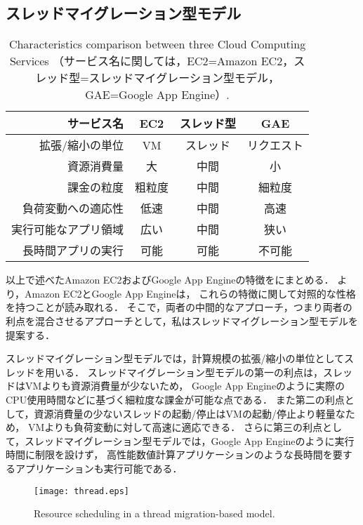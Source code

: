 \documentclass[10pt]{jsarticle}
\begin{document}
\subsection{スレッドマイグレーション型モデル}
\label{sec:cloud_thread}

\begin{table}
  \centering
  \caption{Characteristics comparison between three Cloud Computing Services
    （サービス名に関しては，EC2=Amazon EC2，スレッド型=スレッドマイグレーション型モデル，GAE=Google App Engine）.}
  \label{tab:cloud}
  \begin{tabular}{rccc}\hline
    サービス名&EC2&スレッド型&GAE\\\hline
    拡張/縮小の単位&VM&スレッド&リクエスト\\
    資源消費量&大&中間&小\\
    課金の粒度&粗粒度&中間&細粒度\\
    負荷変動への適応性&低速&中間&高速\\
    実行可能なアプリ領域&広い&中間&狭い\\
    長時間アプリの実行&可能&可能&不可能\\\hline
  \end{tabular}
\end{table}

以上で述べたAmazon EC2およびGoogle App Engineの特徴をにまとめる．
より，Amazon EC2とGoogle App Engineは，
これらの特徴に関して対照的な性格を持つことが読み取れる．
そこで，両者の中間的なアプローチ，つまり両者の利点を混合させるアプローチとして，私はスレッドマイグレーション型モデルを提案する．

スレッドマイグレーション型モデルでは，計算規模の拡張/縮小の単位としてスレッドを用いる．
スレッドマイグレーション型モデルの第一の利点は，スレッドはVMよりも資源消費量が少ないため，
Google App Engineのように実際のCPU使用時間などに基づく細粒度な課金が可能な点である．
また第二の利点として，資源消費量の少ないスレッドの起動/停止はVMの起動/停止より軽量なため，
VMよりも負荷変動に対して高速に適応できる．
さらに第三の利点として，スレッドマイグレーション型モデルでは，Google App Engineのように実行時間に制限を設けず，
高性能数値計算アプリケーションのような長時間を要するアプリケーションも実行可能である．

\begin{figure}
  \centering
  \texttt{[image: thread.eps]}
  \caption{Resource scheduling in a thread migration-based model.}
  \label{fig:thread}
\end{figure}
\end{document}
